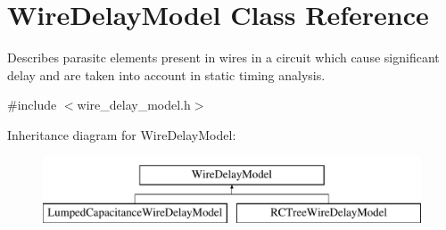 \hypertarget{classWireDelayModel}{\section{Wire\-Delay\-Model Class Reference}
\label{classWireDelayModel}
}


Describes parasitc elements present in wires in a circuit which cause significant delay and are taken into account in static timing analysis.  




{\ttfamily \#include $<$wire\-\_\-delay\-\_\-model.\-h$>$}

Inheritance diagram for Wire\-Delay\-Model\-:\begin{figure}[H]
\begin{center}
\leavevmode
\includegraphics[height=2.000000cm]{classWireDelayModel}
\end{center}
\end{figure}
